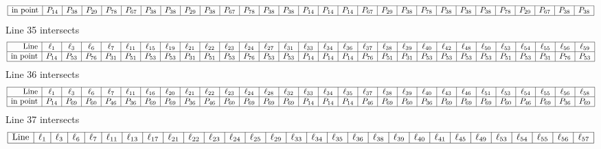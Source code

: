 \documentclass{article}
\begin{document}
{$$\begin{array}{|r*{28}{|c}|}
\hline
\mbox{in point}  & P_{14} & P_{38} & P_{29} & P_{78} & P_{67} & P_{38} & P_{38} & P_{29} & P_{38} & P_{67} & P_{78} & P_{38} & P_{38} & P_{14} & P_{14} & P_{14} & P_{67} & P_{29} & P_{38} & P_{78} & P_{38} & P_{38} & P_{38} & P_{78} & P_{29} & P_{67} & P_{38} & P_{38}\\
\hline
\end{array}
$$
Line 35 intersects 
$$
\begin{array}{|r*{28}{|c}|}
\hline
\mbox{Line}  & \ell_{1} & \ell_{3} & \ell_{6} & \ell_{7} & \ell_{11} & \ell_{15} & \ell_{19} & \ell_{21} & \ell_{22} & \ell_{23} & \ell_{24} & \ell_{27} & \ell_{31} & \ell_{33} & \ell_{34} & \ell_{36} & \ell_{37} & \ell_{38} & \ell_{39} & \ell_{40} & \ell_{42} & \ell_{48} & \ell_{50} & \ell_{53} & \ell_{54} & \ell_{55} & \ell_{56} & \ell_{59}\\
\hline
\mbox{in point}  & P_{14} & P_{53} & P_{76} & P_{31} & P_{51} & P_{53} & P_{53} & P_{31} & P_{51} & P_{53} & P_{76} & P_{53} & P_{53} & P_{14} & P_{14} & P_{14} & P_{76} & P_{51} & P_{31} & P_{53} & P_{53} & P_{53} & P_{53} & P_{51} & P_{53} & P_{31} & P_{76} & P_{53}\\
\hline
\end{array}
$$
Line 36 intersects 
$$
\begin{array}{|r*{28}{|c}|}
\hline
\mbox{Line}  & \ell_{1} & \ell_{3} & \ell_{6} & \ell_{7} & \ell_{11} & \ell_{16} & \ell_{20} & \ell_{21} & \ell_{22} & \ell_{23} & \ell_{24} & \ell_{28} & \ell_{32} & \ell_{33} & \ell_{34} & \ell_{35} & \ell_{37} & \ell_{38} & \ell_{39} & \ell_{40} & \ell_{43} & \ell_{46} & \ell_{51} & \ell_{53} & \ell_{54} & \ell_{55} & \ell_{56} & \ell_{58}\\
\hline
\mbox{in point}  & P_{14} & P_{69} & P_{60} & P_{46} & P_{36} & P_{69} & P_{69} & P_{36} & P_{46} & P_{60} & P_{69} & P_{69} & P_{69} & P_{14} & P_{14} & P_{14} & P_{46} & P_{69} & P_{60} & P_{36} & P_{69} & P_{69} & P_{69} & P_{60} & P_{46} & P_{69} & P_{36} & P_{69}\\
\hline
\end{array}
$$
Line 37 intersects 
$$
\begin{array}{|r*{28}{|c}|}
\hline
\mbox{Line}  & \ell_{1} & \ell_{3} & \ell_{6} & \ell_{7} & \ell_{11} & \ell_{13} & \ell_{17} & \ell_{21} & \ell_{22} & \ell_{23} & \ell_{24} & \ell_{25} & \ell_{29} & \ell_{33} & \ell_{34} & \ell_{35} & \ell_{36} & \ell_{38} & \ell_{39} & \ell_{40} & \ell_{41} & \ell_{45} & \ell_{49} & \ell_{53} & \ell_{54} & \ell_{55} & \ell_{56} & \ell_{57}\\
\hline

\end{array}$$}
\end{document}
